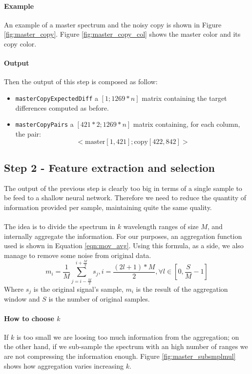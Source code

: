 \documentclass[twocolumn,a4paper]{article}
\begin{document}
\paragraph{Example} An example of a master spectrum and the noisy copy is shown in Figure \ref{fig:master_copy}. Figure \ref{fig:master_copy_col} shows the master color and its copy color. 
\paragraph{Output} Then the output of this step is composed as follow:
\begin{itemize}
    \item \texttt{masterCopyExpectedDiff} a $[1; 1269*n]$ matrix containing the target differences computed as before.
    \item \texttt{masterCopyPairs} a $[421*2; 1269*n]$ matrix containing, for each column, the pair:
    \begin{equation}
        <\text{master}[1,421]; \text{copy} [422,842]>
    \end{equation}
\end{itemize}
\subsection{Step 2 - Feature extraction and selection}
The output of the previous step is clearly too big in terms of a single sample to be feed to a shallow neural network. Therefore we need to reduce the quantity of information provided per sample, maintaining quite the same quality. 
\paragraph{} The idea is to divide the spectrum in $k$ wavelength ranges of size $M$, and internally aggregate the information. For our purposes, an aggregation function used is shown in Equation \ref{eqn:mov_avg}. Using this formula, as a side, we also manage to remove some noise from original data.
\begin{equation} \label{eqn:mov_avg}
	m_i = \frac{1}{M} \sum_{j=i-\frac{M}{2}}^{i+\frac{M}{2}} s_j,  i = \frac{(2l+1)*M}{2}, \forall l \in [0,\frac{S}{M}-1]
\end{equation}
Where $s_j$ is the original signal's sample, $m_i$ is the result of the aggregation window and $S$ is the number of original samples.
\paragraph{How to choose $k$} If $k$ is too small we are loosing too much information from the aggregation; on the other hand, if we sub-sample the spectrum with an high number of ranges we are not compressing the information enough. Figure \ref{fig:master_subsmplmul} shows how aggregation varies increasing $k$.
\end{document}
